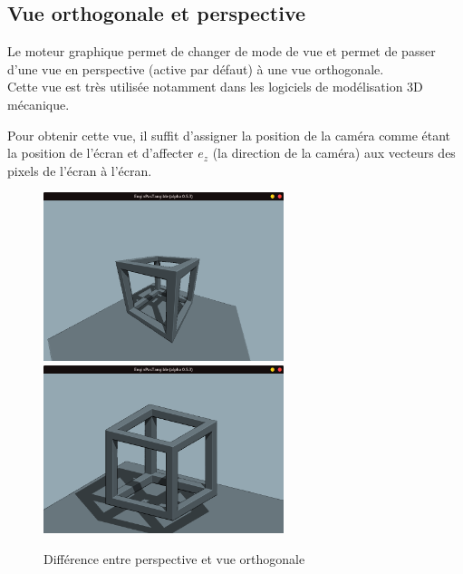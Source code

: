 \subsection{Vue orthogonale et perspective}
Le moteur graphique permet de changer de mode de vue et permet de passer d'une vue en perspective (active par défaut) à une vue orthogonale.\\
Cette vue est très utilisée notamment dans les logiciels de modélisation 3D mécanique.\\
\par
Pour obtenir cette vue, il suffit d'assigner la position de la caméra comme étant la position de l'écran et d'affecter $e_z$ (la direction de la caméra) aux vecteurs des pixels de l'écran à l'écran.
\begin{figure}[h]
    \centering
    \includegraphics[width=7cm]{images/screens/orthoff.png}
    \includegraphics[width=7cm]{images/screens/orthon.png}
    \caption{Différence entre perspective et vue orthogonale}
    \label{fig:ombres}
\end{figure}